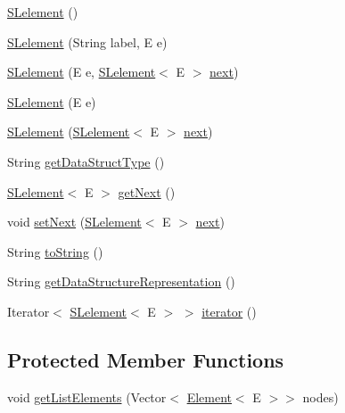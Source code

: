 \begin{DoxyCompactItemize}
\item 
\mbox{\hyperlink{classbridges_1_1base_1_1_s_lelement_ab9c8a08dadd76d7e0c29d7c41cf277c4}{S\+Lelement}} ()
\item 
\mbox{\hyperlink{classbridges_1_1base_1_1_s_lelement_a8e32c9b9e8fc8f9f1eccb14b97e031e7}{S\+Lelement}} (String label, E e)
\item 
\mbox{\hyperlink{classbridges_1_1base_1_1_s_lelement_abc5e333fd2f3289eede108175908f97d}{S\+Lelement}} (E e, \mbox{\hyperlink{classbridges_1_1base_1_1_s_lelement}{S\+Lelement}}$<$ E $>$ \mbox{\hyperlink{classbridges_1_1base_1_1_s_lelement_abf61c96a74ad319d561c6952ea388e0e}{next}})
\item 
\mbox{\hyperlink{classbridges_1_1base_1_1_s_lelement_aa40c4c7bda4d7a852edb21a8ed537cae}{S\+Lelement}} (E e)
\item 
\mbox{\hyperlink{classbridges_1_1base_1_1_s_lelement_ab5b1c20ba1d1923fad0780052fb51c99}{S\+Lelement}} (\mbox{\hyperlink{classbridges_1_1base_1_1_s_lelement}{S\+Lelement}}$<$ E $>$ \mbox{\hyperlink{classbridges_1_1base_1_1_s_lelement_abf61c96a74ad319d561c6952ea388e0e}{next}})
\item 
String \mbox{\hyperlink{classbridges_1_1base_1_1_s_lelement_a8c48a2d34b238fa0ae7bf2d1ee58ea88}{get\+Data\+Struct\+Type}} ()
\item 
\mbox{\hyperlink{classbridges_1_1base_1_1_s_lelement}{S\+Lelement}}$<$ E $>$ \mbox{\hyperlink{classbridges_1_1base_1_1_s_lelement_a060c4671e05e3f20b16630343393b80d}{get\+Next}} ()
\item 
void \mbox{\hyperlink{classbridges_1_1base_1_1_s_lelement_afdd42f03071b2614822b73729e1a5a1a}{set\+Next}} (\mbox{\hyperlink{classbridges_1_1base_1_1_s_lelement}{S\+Lelement}}$<$ E $>$ \mbox{\hyperlink{classbridges_1_1base_1_1_s_lelement_abf61c96a74ad319d561c6952ea388e0e}{next}})
\item 
String \mbox{\hyperlink{classbridges_1_1base_1_1_s_lelement_af0ec4da5b29d0f5ab6ab38e91cca51f9}{to\+String}} ()
\item 
String \mbox{\hyperlink{classbridges_1_1base_1_1_s_lelement_a2928f5e8640deaceeecf01adcd75669b}{get\+Data\+Structure\+Representation}} ()
\item 
Iterator$<$ \mbox{\hyperlink{classbridges_1_1base_1_1_s_lelement}{S\+Lelement}}$<$ E $>$ $>$ \mbox{\hyperlink{classbridges_1_1base_1_1_s_lelement_a2ecf938707a8009f28dcb98112ede9d9}{iterator}} ()
\end{DoxyCompactItemize}
\subsection*{Protected Member Functions}
\begin{DoxyCompactItemize}
\item 
void \mbox{\hyperlink{classbridges_1_1base_1_1_s_lelement_abadffea339171349a8e86ded9cd3fe21}{get\+List\+Elements}} (Vector$<$ \mbox{\hyperlink{classbridges_1_1base_1_1_element}{Element}}$<$ E $>$$>$ nodes)
\end{DoxyCompactItemize}
